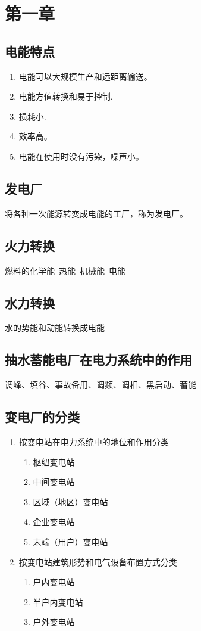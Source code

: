 \documentclass[UTF8]{ctexart}
\begin{document}
\tableofcontents\thispagestyle{empty}
\newpage
\setcounter{page}{1}
\section{第一章}  
\subsection{电能特点}
\begin{enumerate}[(1)]
\item  电能可以大规模生产和远距离输送。
\item  电能方值转换和易于控制.
\item  损耗小.  
\item  效率高。  
\item  电能在使用时没有污染，噪声小。
\end{enumerate}
\subsection{发电厂}
将各种一次能源转变成电能的工厂，称为发电厂。
\subsection{火力转换}
\par 燃料的化学能--热能--机械能--电能
\subsection{水力转换}
\par 水的势能和动能转换成电能
\subsection{抽水蓄能电厂在电力系统中的作用}
调峰、填谷、事故备用、调频、调相、黑启动、蓄能
\subsection{变电厂的分类}
\begin{enumerate}[1]
\item  按变电站在电力系统中的地位和作用分类
\begin{enumerate}[(1)]
 \item 枢纽变电站
 \item 中间变电站
 \item 区域（地区）变电站
 \item 企业变电站
 \item 末端（用户）变电站   
\end{enumerate}
\item 按变电站建筑形势和电气设备布置方式分类
\begin{enumerate}[(1)]
  \item 户内变电站
  \item 半户内变电站
  \item 户外变电站  
\end{enumerate}  
\end{enumerate}
\end{document}
